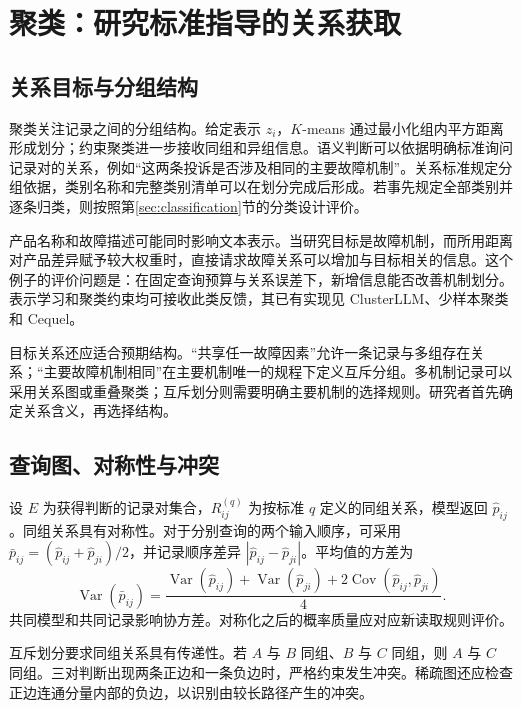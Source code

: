 \documentclass[UTF8,a4paper,zihao=-4,fontset=fandol]{ctexart}
\newcommand{\Var}{\operatorname{Var}}
\begin{document}
\section{聚类：研究标准指导的关系获取}\label{sec:clustering}

\subsection{关系目标与分组结构}

聚类关注记录之间的分组结构。给定表示 $z_i$，$K$-means 通过最小化组内平方距离形成划分；约束聚类进一步接收同组和异组信息\citep{wagstaff2001}。语义判断可以依据明确标准询问记录对的关系，例如“这两条投诉是否涉及相同的主要故障机制”。关系标准规定分组依据，类别名称和完整类别清单可以在划分完成后形成。若事先规定全部类别并逐条归类，则按照第\ref{sec:classification}节的分类设计评价。

产品名称和故障描述可能同时影响文本表示。当研究目标是故障机制，而所用距离对产品差异赋予较大权重时，直接请求故障关系可以增加与目标相关的信息。这个例子的评价问题是：在固定查询预算与关系误差下，新增信息能否改善机制划分。表示学习和聚类约束均可接收此类反馈，其已有实现见 ClusterLLM、少样本聚类和 Cequel\citep{clusterllm2023,viswanathan2024,cequel2025}。

目标关系还应适合预期结构。“共享任一故障因素”允许一条记录与多组存在关系；“主要故障机制相同”在主要机制唯一的规程下定义互斥分组。多机制记录可以采用关系图或重叠聚类；互斥划分则需要明确主要机制的选择规则。研究者首先确定关系含义，再选择结构。

\subsection{查询图、对称性与冲突}

设 $E$ 为获得判断的记录对集合，$R_{ij}^{(q)}$ 为按标准 $q$ 定义的同组关系，模型返回 $\widehat p_{ij}$。同组关系具有对称性。对于分别查询的两个输入顺序，可采用 $\bar p_{ij}=(\widehat p_{ij}+\widehat p_{ji})/2$，并记录顺序差异 $|\widehat p_{ij}-\widehat p_{ji}|$。平均值的方差为
\begin{equation}
 \Var(\bar p_{ij})=
 \frac{\Var(\widehat p_{ij})+\Var(\widehat p_{ji})
 +2\operatorname{Cov}(\widehat p_{ij},\widehat p_{ji})}{4}.
 \label{eq:symmetry}
\end{equation}
共同模型和共同记录影响协方差。对称化之后的概率质量应对应新读取规则评价。

互斥划分要求同组关系具有传递性。若 $A$ 与 $B$ 同组、$B$ 与 $C$ 同组，则 $A$ 与 $C$ 同组。三对判断出现两条正边和一条负边时，严格约束发生冲突。稀疏图还应检查正边连通分量内部的负边，以识别由较长路径产生的冲突。
\end{document}
